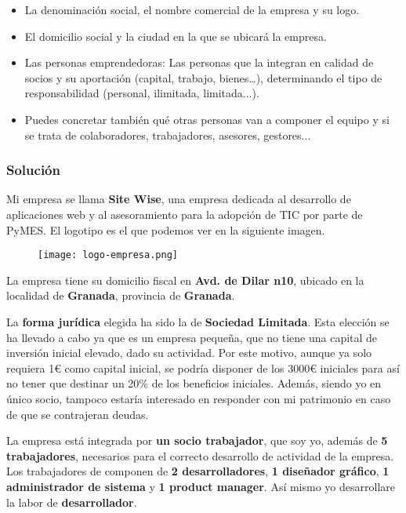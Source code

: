 \begin{itemize}
    \item  La denominación social, el nombre comercial de la empresa y su logo.
    \item El domicilio social y la ciudad en la que se ubicará la empresa.
    \item Las personas emprendedoras: Las personas que la integran en calidad de socios y su aportación (capital, trabajo, bienes…), determinando el tipo de responsabilidad (personal, ilimitada, limitada...).
    \item Puedes concretar también qué otras personas van a componer el equipo y si se trata de colaboradores, trabajadores, asesores, gestores...
\end{itemize}

\subsubsection{Solución}

Mi empresa se llama \textbf{Site Wise}, una empresa dedicada al desarrollo de aplicaciones web y al asesoramiento para la adopción de TIC por parte de PyMES. El logotipo es el que podemos ver en la siguiente imagen.

 \begin{figure}[H]
    \centering
    \texttt{[image: logo-empresa.png]}
\end{figure}

La empresa tiene su domicilio fiscal en \textbf{Avd. de Dilar n10}, ubicado en la localidad de \textbf{Granada}, provincia de \textbf{Granada}.

La \textbf{forma jurídica} elegida ha sido la de \textbf{Sociedad Limitada}. Esta elección se ha llevado a cabo ya que es un empresa pequeña, que no tiene una capital de inversión inicial elevado, dado su actividad. Por este motivo, aunque ya solo requiera 1€ como capital inicial, se podría disponer de los 3000€ iniciales para así no tener que destinar un 20\% de los beneficios iniciales. Además, siendo yo en único socio, tampoco estaría interesado en responder con mi patrimonio en caso de que se contrajeran deudas.

La empresa está integrada por \textbf{un socio trabajador}, que soy yo, además de \textbf{5 trabajadores}, necesarios para el correcto desarrollo de actividad de la empresa. Los trabajadores de componen de \textbf{2 desarrolladores}, \textbf{1 diseñador gráfico}, \textbf{1 administrador de sistema} y \textbf{1 product manager}. Así mismo yo desarrollare la labor de \textbf{desarrollador}.

